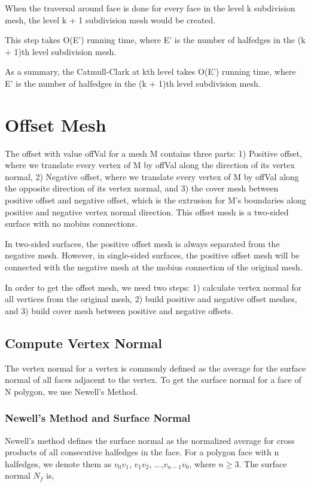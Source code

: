 \documentclass[12pt]{article}
\begin{document}
When the traversal around face is done for every face in the level k subdivision mesh, the level k + 1 subdivision mesh would be created.

This step takes O(E') running time, where E' is the number of halfedges in the (k + 1)th level subdivision mesh.

As a summary, the Catmull-Clark at kth level takes O(E') running time, where E' is the number of halfedges in the (k + 1)th level subdivision mesh.

\newpage
\section{Offset Mesh} \label{sec:offset}

The offset with value offVal for a mesh M contains three parts: 1) Positive offset, where we translate every vertex of M by offVal along the direction of its vertex normal, 2) Negative offset, where we translate every vertex of M by offVal along the opposite direction of its vertex normal, and 3) the cover mesh between positive offset and negative offset, which is the extrusion for M's boundaries along positive and negative vertex normal direction. This offset mesh is a two-sided surface with no mobius connections.

In two-sided surfaces, the positive offset mesh is always separated from the negative mesh. However, in single-sided surfaces, the positive offset mesh will be connected with the negative mesh at the mobius connection of the original mesh.

In order to get the offset mesh, we need two steps: 1) calculate vertex normal for all vertices from the original mesh, 2) build positive and negative offset meshes, and 3) build cover mesh between positive and negative offsets.

\subsection{Compute Vertex Normal}
The vertex normal for a vertex is commonly defined as the average for the surface normal of all faces adjacent to the vertex. To get the surface normal for a face of N polygon, we use Newell's Method.

\subsubsection{Newell's Method and Surface Normal}
Newell's method defines the surface normal as the normalized average for cross products of all consecutive halfedges in the face. For a polygon face with n halfedges, we denote them as $v_0v_1$, $v_1v_2$, ...,$v_{n-1}v_0$, where $ n \ge 3$. The surface normal $N_{f}$ is,
\end{document}
